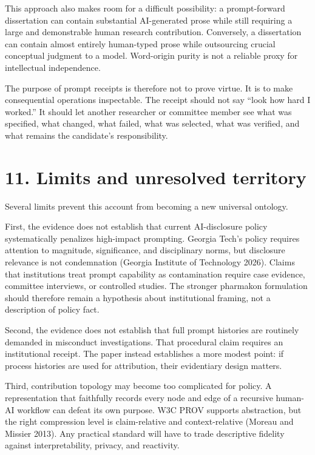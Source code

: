 \documentclass[
]{article}
\begin{document}
This approach also makes room for a difficult possibility: a
prompt-forward dissertation can contain substantial AI-generated prose
while still requiring a large and demonstrable human research
contribution. Conversely, a dissertation can contain almost entirely
human-typed prose while outsourcing crucial conceptual judgment to a
model. Word-origin purity is not a reliable proxy for intellectual
independence.

The purpose of prompt receipts is therefore not to prove virtue. It is
to make consequential operations inspectable. The receipt should not say
``look how hard I worked.'' It should let another researcher or
committee member see what was specified, what changed, what failed, what
was selected, what was verified, and what remains the candidate's
responsibility.

\section{11. Limits and unresolved
territory}\label{limits-and-unresolved-territory}

Several limits prevent this account from becoming a new universal
ontology.

First, the evidence does not establish that current AI-disclosure policy
systematically penalizes high-impact prompting. Georgia Tech's policy
requires attention to magnitude, significance, and disciplinary norms,
but disclosure relevance is not condemnation (Georgia Institute of
Technology 2026). Claims that institutions treat prompt capability as
contamination require case evidence, committee interviews, or controlled
studies. The stronger pharmakon formulation should therefore remain a
hypothesis about institutional framing, not a description of policy
fact.

Second, the evidence does not establish that full prompt histories are
routinely demanded in misconduct investigations. That procedural claim
requires an institutional receipt. The paper instead establishes a more
modest point: if process histories are used for attribution, their
evidentiary design matters.

Third, contribution topology may become too complicated for policy. A
representation that faithfully records every node and edge of a
recursive human-AI workflow can defeat its own purpose. W3C PROV
supports abstraction, but the right compression level is claim-relative
and context-relative (Moreau and Missier 2013). Any practical standard
will have to trade descriptive fidelity against interpretability,
privacy, and reactivity.
\end{document}
